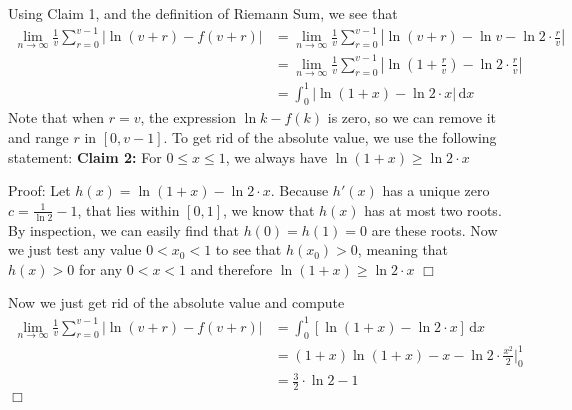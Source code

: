 \begin{solution}
    Using Claim 1, and the definition of Riemann Sum, we see that 
    \begin{align*}
          \lim_{n \to \infty} \frac{1}{v} \sum_{r=0}^{v-1} \left|\ln ({v+r}) - f(v+r) \right| &=
          \lim_{n \to \infty} \frac{1}{v} \sum_{r=0}^{v-1} \left| \ln(v+r) - \ln v - \ln 2 \cdot \frac{r}{v} \right| \\
          &= \lim_{n \to \infty} \frac{1}{v} \sum_{r=0}^{v-1} \left| \ln \left( 1 + \frac{r}{v} \right) - \ln2 \cdot \frac{r}{v}\right| \\
          &= \int_0^1 \big| \ln(1+x) - \ln2 \cdot x \big| \, \mathrm{d}x
    \end{align*}
    Note that when $r=v$, the expression $\ln k - f(k)$ is zero, so we can remove it and range $r$ in $[0,v-1]$.
    To get rid of the absolute value, we use the following statement: \smallbreak
    \textbf{Claim 2:} For $0 \leq x \leq 1$, we always have $\ln (1+x) \geq \ln 2 \cdot x$

    Proof: Let $h(x) = \ln(1+x) - \ln2 \cdot x$. Because $h'(x)$ has a unique zero $c = \frac{1}{\ln 2} - 1$, that lies within $[0,1]$, we know that $h(x)$ has at most two roots. By inspection, we can easily find that $h(0)=h(1)=0$ are these roots. Now we just test any value $0<x_0<1$ to see that $h(x_0)>0$, meaning that $h(x)>0$ for any $0<x<1$ and therefore  $\ln (1+x) \geq \ln 2 \cdot x$ $\Box$

    Now we just get rid of the absolute value and compute
    \begin{align*}
         \lim_{n \to \infty} \frac{1}{v} \sum_{r=0}^{v-1} \left|\ln ({v+r}) - f(v+r) \right| &=
         \int_0^1 [\ln(1+x) - \ln2 \cdot x] \, \mathrm{d}x \\
         &= (1+x) \ln (1+x) - x -  \ln2 \cdot \frac{x^2}{2} \bigg |_0^1 \\
         &= \frac{3}{2} \cdot \ln 2 - 1 
    \end{align*}
    $\Box$
\end{solution}

 


